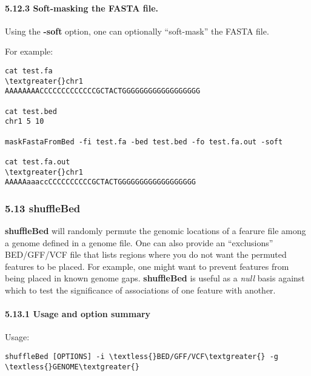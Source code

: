 \documentclass[letterpaper,10pt,english]{sphinxmanual}
\begin{document}
\paragraph{5.12.3 Soft-masking the FASTA file.}
\label{content/maskfastafromBed:soft-masking-the-fasta-file}
Using the \textbf{-soft} option, one can optionally ``soft-mask'' the FASTA file.

For example:

\begin{Verbatim}[commandchars=\\\{\}]
cat test.fa
\textgreater{}chr1
AAAAAAAACCCCCCCCCCCCCGCTACTGGGGGGGGGGGGGGGGGG

cat test.bed
chr1 5 10

maskFastaFromBed -fi test.fa -bed test.bed -fo test.fa.out -soft

cat test.fa.out
\textgreater{}chr1
AAAAAaaaccCCCCCCCCCCGCTACTGGGGGGGGGGGGGGGGGG
\end{Verbatim}


\subsubsection{5.13 shuffleBed}
\label{content/shuffleBed:shufflebed}\label{content/shuffleBed::doc}
\textbf{shuffleBed} will randomly permute the genomic locations of a fearure file among a genome defined in a
genome file. One can also provide an ``exclusions'' BED/GFF/VCF file that lists regions where you do
not want the permuted features to be placed. For example, one might want to prevent features from
being placed in known genome gaps. \textbf{shuffleBed} is useful as a \emph{null} basis against which to test the
significance of associations of one feature with another.


\paragraph{5.13.1 Usage and option summary}
\label{content/shuffleBed:usage-and-option-summary}
Usage:

\begin{Verbatim}[commandchars=\\\{\}]
shuffleBed [OPTIONS] -i \textless{}BED/GFF/VCF\textgreater{} -g \textless{}GENOME\textgreater{}
\end{Verbatim}
\end{document}
